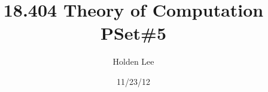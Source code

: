 
\makeatother



%
%
\makeatletter
\newenvironment{problem}{\@startsection
       {section}
       {1}
       {-.2em}
       {-3.5ex plus -1ex minus -.2ex}
       {2.3ex plus .2ex}
       {\pagebreak[3]%
       \large\bf\noindent{Problem }
       }
       }
       {%
       }
\makeatother

\renewcommand{\div}{\operatorname{div}}
%
%
\usepackage{fancyhdr}
\pagestyle{fancy}
\rhead{\thepage} 
\cfoot{} 
\renewcommand{\headrulewidth}{.3pt} 
\renewcommand{\footrulewidth}{.3pt}
\setlength\voffset{-0.25in}
\setlength\textheight{648pt}



%
%    

\title{18.404 Theory of Computation PSet\#5}%
\author{Holden Lee}
\date{11/23/12}%
\maketitle

